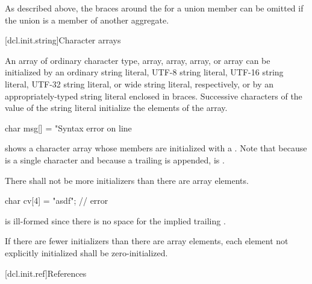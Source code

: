 \pnum
\begin{note}
As described above,
the braces around the
for a union member can be omitted if the
union is a member of another aggregate.
\end{note}

[dcl.init.string]{Character arrays}%

\pnum
An array of ordinary character type,
 array,
 array,
 array,
or  array
can be initialized by
an ordinary string literal,
UTF-8 string literal,
UTF-16 string literal,
UTF-32 string literal, or
wide string literal,
respectively, or by an appropriately-typed string literal enclosed in
braces.
%
Successive
characters of the
value of the string literal
initialize the elements of the array.
\begin{example}

\begin{codeblock}
char msg[] = "Syntax error on line %
\end{codeblock}

shows a character array whose members are initialized
with a
.
Note that because
is a single character and
because a trailing
is appended,
is
.
\end{example}

\pnum
There shall not be more initializers than there are array elements.
\begin{example}

\begin{codeblock}
char cv[4] = "asdf";            // error
\end{codeblock}

is ill-formed since there is no space for the implied trailing
.
\end{example}

\pnum
If there are fewer initializers than there are array elements, each element not
explicitly initialized shall be zero-initialized.

[dcl.init.ref]{References}%

